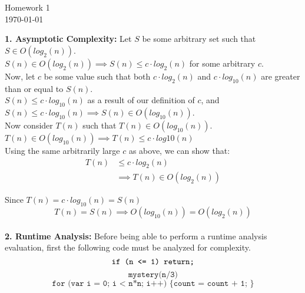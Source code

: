 \documentclass[12pt]{article}
\begin{document}
\begin{center}
{\Large Homework 1}\\ \today{}
\end{center}
\vspace{5pt}
\textbf{1. Asymptotic Complexity:} Let $S$ be some arbitrary set such that $S \in O(log_2(n))$. \\

$S(n) \in O(log_2(n)) \implies S(n) \leq c \cdot log_2(n)$ for some arbitrary $c$.\\

Now, let $c$ be some value such that both $c \cdot log_2(n)$ and $c \cdot log_{10}(n)$ are greater than or equal to $S(n)$. \\

$S(n) \leq c \cdot log_{10}(n)$ as a result of our definition of $c$, and $S(n) \leq c \cdot log_{10}(n) \implies S(n) \in O(log_{10}(n))$. \\

Now consider $T(n)$ such that $T(n) \in O(log_{10}(n))$. \\

$T(n) \in O(log_{10}(n)) \implies T(n) \leq c \cdot log{10}(n)$ \\

Using the same arbitrarily large $c$ as above, we can show that: \\
\begin{align*}
    T(n) &\leq c \cdot log_2(n) \\
    &\implies T(n) \in O(log_2(n))
\end{align*}

Since $T(n) = c \cdot log_{10}(n) = S(n)$
\begin{equation*}
    T(n) = S(n) \implies O(log_{10}(n)) = O(log_2(n))
\end{equation*} \\

\textbf{2. Runtime Analysis:} Before being able to perform a runtime analysis evaluation, first the following code must be analyzed for complexity.
\begin{equation}
\texttt{if (n <= 1) \\}
\texttt{~return;}
\end{equation}
\begin{equation}
\texttt{mystery(n/3)}
\end{equation}
\begin{equation}
\texttt{for (var i = 0; i < n*n; i++) \{ count = count + 1; \}}
\end{equation} \\
\end{document}
